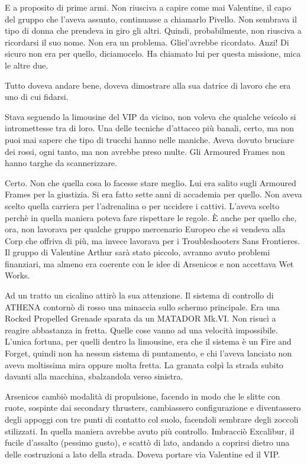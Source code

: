     E a proposito di prime armi. Non riusciva a capire come mai Valentine, il capo del gruppo che l'aveva assunto,
    continuasse a chiamarlo Pivello. Non sembrava il tipo di donna che prendeva in giro gli altri. Quindi,
    probabilmente, non riusciva a ricordarsi il suo nome. Non era un problema. Gliel'avrebbe ricordato. Anzi! Di sicuro
    non era per quello, diciamocelo. Ha chiamato lui per questa missione, mica le altre due.

    Tutto doveva andare bene, doveva dimostrare alla sua datrice di lavoro che era uno di cui fidarsi.

    Stava seguendo la limousine del VIP da vicino, non voleva che qualche veicolo si intromettesse tra di loro. Una
    delle tecniche d'attacco più banali, certo, ma non puoi mai sapere che tipo di trucchi hanno nelle maniche. Aveva
    dovuto bruciare dei rossi, ogni tanto, ma non avrebbe preso multe. Gli Armoured Frames non hanno targhe da
    scannerizzare.
    
    Certo. Non che quella cosa lo facesse stare meglio. Lui era salito sugli Armoured Frames per la giustizia. Si era
    fatto sette anni di accademia per quello. Non aveva scelto quella carriera per l'adrenalina o per uccidere i
    cattivi. L'aveva scelto perchè in quella maniera poteva fare rispettare le regole. È anche per quello che, ora, non
    lavorava per qualche gruppo mercenario Europeo che si vendeva alla Corp che offriva di più, ma invece lavorava per
    i Troubleshooters Sans Frontieres. Il gruppo di Valentine Arthur sarà stato piccolo, avranno avuto problemi
    finanziari, ma almeno era coerente con le idee di Arsenicos e non accettava Wet Works.

    Ad un tratto un cicalino attirò la sua attenzione. Il sistema di controllo di ATHENA contornò di rosso una minaccia
    sullo schermo principale. Era una Rocked Propelled Grenade sparata da un MATADOR Mk.VI. Non risucì a reagire
    abbastanza in fretta. Quelle cose vanno ad una velocità impossibile. L'unica fortuna, per quelli dentro la
    limousine, era che il sistema è un Fire and Forget, quindi non ha nessun sistema di puntamento, e chi l'aveva
    lanciato non aveva moltissima mira oppure molta fretta. La granata colpì la strada subito davanti alla macchina,
    sbalzandola verso sinistra.

    Arsenicos cambiò modalità di propulsione, facendo in modo che le slitte con ruote, sospinte dai secondary thrusters,
    cambiassero configurazione e diventassero degli appoggi con tre punti di contatto col suolo, facendoli sembrare
    degli zoccoli stilizzati. In quella maniera avrebbe avuto più controllo. Imbracciò Excalibur, il fucile d'assalto
    (pessimo gusto), e scattò di lato, andando a coprirsi dietro una delle costruzioni a lato della strada. Doveva
    portare via Valentine ed il VIP.

